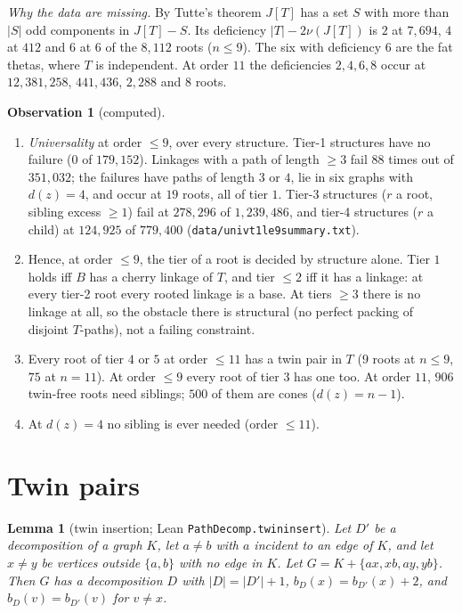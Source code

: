 \documentclass[11pt]{amsart}
\newtheorem{lemma}[theorem]{Lemma}
\theoremstyle{definition}
\newtheorem{observation}[theorem]{Observation}
\theoremstyle{remark}
\renewcommand{\_}{\oldunderscore\allowbreak}
\begin{document}
\emph{Why the data are missing.} By Tutte's theorem $J[T]$ has a set $S$ with more than $|S|$ odd
components in $J[T]-S$. Its deficiency $|T|-2\nu(J[T])$ is $2$ at $7{,}694$, $4$ at $412$ and $6$
at $6$ of the $8{,}112$ roots ($n\le9$). The six with deficiency $6$ are the fat thetas, where $T$
is independent. At order $11$ the deficiencies $2,4,6,8$ occur at $12{,}381{,}258$, $441{,}436$,
$2{,}288$ and $8$ roots.

\begin{observation}[computed]\label{obs:structure}
\begin{enumerate}[label=(\alph*)]
\item \emph{Universality} at order $\le9$, over every structure. Tier-1 structures have no failure
($0$ of $179{,}152$). Linkages with a path of length $\ge3$ fail $88$ times out of $351{,}032$; the
failures have paths of length $3$ or $4$, lie in six graphs with $d(z)=4$, and occur at $19$ roots,
all of tier $1$. Tier-3 structures ($r$ a root, sibling excess $\ge1$) fail at $278{,}296$ of
$1{,}239{,}486$, and tier-4 structures ($r$ a child) at $124{,}925$ of $779{,}400$
(\texttt{data/univ\_t1\_le9\_summary.txt}).
\item Hence, at order $\le9$, the tier of a root is decided by structure alone. Tier $1$ holds iff
$B$ has a cherry linkage of $T$, and tier $\le2$ iff it has a linkage: at every tier-2 root every
rooted linkage is a base. At tiers $\ge3$ there is no linkage at all, so the obstacle there is
structural (no perfect packing of disjoint $T$-paths), not a failing constraint.
\item Every root of tier $4$ or $5$ at order $\le 11$ has a twin pair in $T$ ($9$ roots at
$n\le9$, $75$ at $n=11$). At order $\le9$ every root of tier $3$ has one too. At order $11$,
$906$ twin-free roots need siblings; $500$ of them are cones ($d(z)=n-1$).
\item At $d(z)=4$ no sibling is ever needed (order $\le 11$).
\end{enumerate}
\end{observation}

\section{Twin pairs}\label{sec:twins}

\begin{lemma}[twin insertion; Lean \texttt{PathDecomp.twin\_insert}]\label{lem:twin}
Let $D'$ be a decomposition of a graph $K$, let $a\neq b$ with $a$ incident to an edge of $K$, and
let $x\neq y$ be vertices outside $\{a,b\}$ with no edge in $K$. Let $G=K+\{ax,xb,ay,yb\}$. Then $G$
has a decomposition $D$ with $|D|=|D'|+1$, $b_D(x)=b_{D'}(x)+2$, and $b_D(v)=b_{D'}(v)$ for
$v\ne x$.
\end{lemma}
\end{document}

